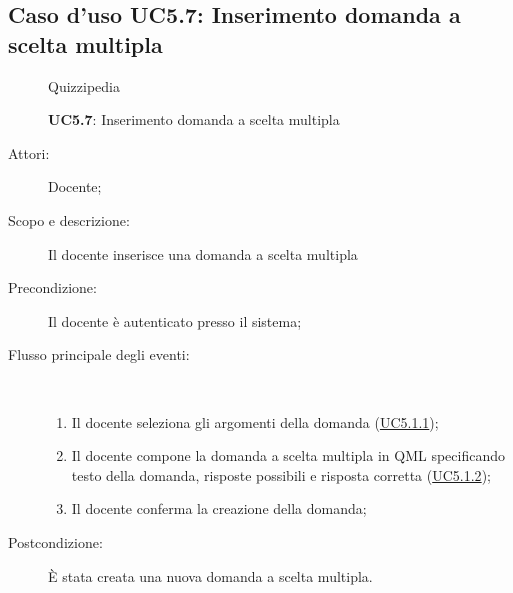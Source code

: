 \subsection{Caso d'uso UC5.7: Inserimento domanda a scelta multipla}
	\begin{figure}[H]
		\centering
		\begin{resizedtikzpicture}{\textwidth}
		\begin{umlsystem}[x=0, fill=lightgray!20]{Quizzipedia}
		\end{umlsystem}
		\end{resizedtikzpicture}
		\caption{\textbf{UC5.7}: Inserimento domanda a scelta multipla}
		\label{UC5.7}
	\end{figure}
\begin{description}
\item[Attori:] Docente;
\item[Scopo e descrizione:] Il docente inserisce una domanda a scelta multipla
      \item[Precondizione:] Il docente è autenticato presso il sistema;

        \item[Flusso principale degli eventi:] \ 
 \begin{enumerate}
          \item Il docente seleziona gli argomenti della domanda (\hyperlink{UC5.1.1}{UC5.1.1});
          \item Il docente compone la domanda a scelta multipla in QML specificando testo della domanda, risposte possibili e risposta corretta (\hyperlink{UC5.1.2}{UC5.1.2});
          \item Il docente conferma la creazione della domanda;

      \end{enumerate}
    \item[Postcondizione:] È stata creata una nuova domanda a scelta multipla.
  \end{description}
\hypertarget{UC5.8}{}
